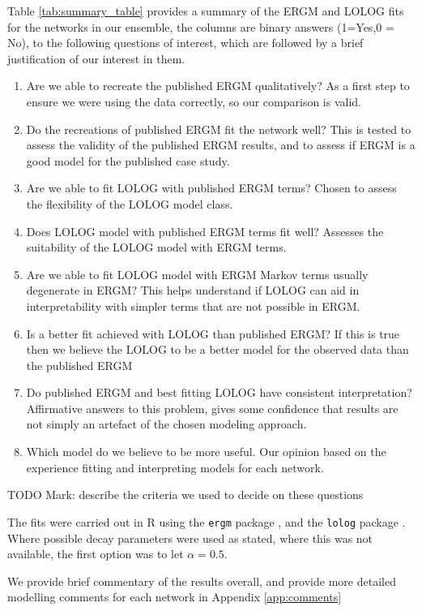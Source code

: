 \documentclass[
]{statsoc}
\begin{document}
Table \ref{tab:summary_table} provides a summary of the ERGM and LOLOG
fits for the networks in our ensemble, the columns are binary answers
(1=Yes,0 = No), to the following questions of interest, which are
followed by a brief justification of our interest in them.

\begin{enumerate}
\item Are we able to recreate the published ERGM qualitatively? As a first step to ensure we were using the data correctly, so our comparison is valid.
\item Do the recreations of published ERGM fit the network well? This is tested to assess the validity of the published ERGM results, and to assess if ERGM is a good model for the published case study.
\item Are we able to fit LOLOG with published ERGM terms? Chosen to assess the flexibility of the LOLOG model class.
\item Does LOLOG model with published ERGM terms fit well? Assesses the suitability of the LOLOG model with ERGM terms.
\item Are we able to fit LOLOG model with ERGM Markov terms usually degenerate in ERGM? This helps understand if LOLOG can aid in interpretability with simpler terms that are not possible in ERGM.
\item Is a better fit achieved with LOLOG than published ERGM? If this is true then we believe the LOLOG to be a better model for the observed data than the published ERGM
\item Do published ERGM and best fitting LOLOG have consistent interpretation? Affirmative answers to this problem, gives some confidence that results are not simply an artefact of the chosen modeling approach.
\item Which model do we believe to be more useful. Our opinion based on the experience fitting  and interpreting models for each network.
\end{enumerate}

TODO Mark: describe the criteria we used to decide on these questions

The fits were carried out in R using the \texttt{ergm} package
\citep{ergm_3_9_4}, and the \texttt{lolog} package \citep{LOLOG_github}.
Where possible decay parameters were used as stated, where this was not
available, the first option was to let \(\alpha= 0.5\).

We provide brief commentary of the results overall, and provide more
detailed modelling comments for each network in Appendix
\ref{app:comments}
\end{document}
